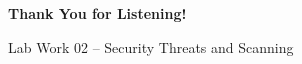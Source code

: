 \begin{frame}[plain]
  \vfill
  \centering
  {\color{TitleColor}\fontsize{32}{38}\selectfont\bfseries Thank You for Listening!\par}
  \vspace{0.5cm}
  {\color{ResearchColor}\fontsize{18}{22}\selectfont Lab Work 02 -- Security Threats and Scanning\par}
  \vfill
\end{frame}
